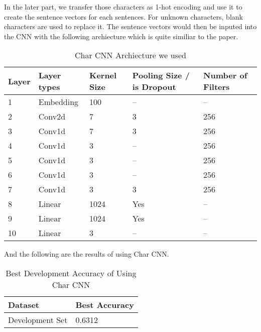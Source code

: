 \documentclass{article}
\begin{document}
In the later part, we transfer those characters as 1-hot encoding and use it to create the sentence vectors for each sentences. For unknown characters, blank characters are used to replace it. The sentence vectors would then be inputed into the CNN with the following archiecture which is quite similiar to the paper.

\begin{table}[htb]
\caption{Char CNN Archiecture we used}
	\label{sample-table}
	\centering
\begin{tabular}{lllll}
\toprule
		\cmidrule{1-5}
		Layer & Layer types & Kernel Size & Pooling Size / is Dropout & Number of Filters 		\\
		\midrule
 			1 & Embedding & 100 & -- & -- \\
 			2 & Conv2d & 7 & 3 & 256 \\
 			3 & Conv1d & 7 & 3 & 256 \\
 			4 & Conv1d & 3 & -- & 256 \\
 			5 & Conv1d & 3 & -- & 256\\
 			6 & Conv1d & 3 & -- & 256 \\
 			7 & Conv1d & 3 & 3 & 256 \\
 			8 & Linear & 1024 & Yes & -- \\
 			9 & Linear & 1024 & Yes & -- \\
 			10 & Linear & 3 & -- & -- \\
\bottomrule
\end{tabular}
\end{table}

And the following are the results of using Char CNN. 

\begin{table}[htb]
	\caption{Best Development Accuracy of Using Char CNN}
	\label{sample-table}
	\centering
	\begin{tabular}{ll}
		\toprule
		\cmidrule{1-2}
		Dataset & Best Accuracy\\
		\midrule
		Development Set & 0.6312  \\
		\bottomrule
	\end{tabular}
\end{table}
\end{document}
